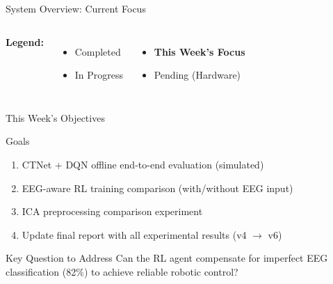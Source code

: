 \documentclass[aspectratio=169, 11pt]{beamer}
\begin{document}
\begin{frame}{System Overview: Current Focus}
    \vspace{3mm}
    \begin{columns}[T]
        \textbf{Legend:}
        \begin{itemize}
            \item[\textcolor{completed}{\rule{8pt}{8pt}}] Completed
            \item[\textcolor{inprogress}{\rule{8pt}{8pt}}] In Progress
        \end{itemize}
        \begin{itemize}
            \item[\textcolor{highlight}{\rule{8pt}{8pt}}] \textbf{This Week's Focus}
            \item[\textcolor{pending}{\rule{8pt}{8pt}}] Pending (Hardware)
        \end{itemize}
    \end{columns}
\end{frame}

\begin{frame}{This Week's Objectives}
    \begin{block}{Goals}
        \begin{enumerate}
            \item CTNet + DQN offline end-to-end evaluation (simulated)
            \item EEG-aware RL training comparison (with/without EEG input)
            \item ICA preprocessing comparison experiment
            \item Update final report with all experimental results (v4 $\rightarrow$ v6)
        \end{enumerate}
    \end{block}
    
    \vspace{5mm}
    
    \begin{alertblock}{Key Question to Address}
        Can the RL agent compensate for imperfect EEG classification (82\%) to achieve reliable robotic control?
    \end{alertblock}
\end{frame}
\end{document}
